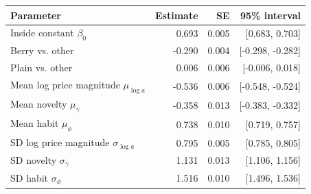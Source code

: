 \begin{tabular}{lrrr}\toprule
Parameter & Estimate & SE & 95\% interval\\\midrule
Inside constant $\beta_0$ & 0.693 & 0.005 & [0.683, 0.703] \\
Berry vs. other & -0.290 & 0.004 & [-0.298, -0.282] \\
Plain vs. other & 0.006 & 0.006 & [-0.006, 0.018] \\
Mean log price magnitude $\mu_{\log a}$ & -0.536 & 0.006 & [-0.548, -0.524] \\
Mean novelty $\mu_\gamma$ & -0.358 & 0.013 & [-0.383, -0.332] \\
Mean habit $\mu_\phi$ & 0.738 & 0.010 & [0.719, 0.757] \\
SD log price magnitude $\sigma_{\log a}$ & 0.795 & 0.005 & [0.785, 0.805] \\
SD novelty $\sigma_\gamma$ & 1.131 & 0.013 & [1.106, 1.156] \\
SD habit $\sigma_\phi$ & 1.516 & 0.010 & [1.496, 1.536] \\
\bottomrule\end{tabular}

